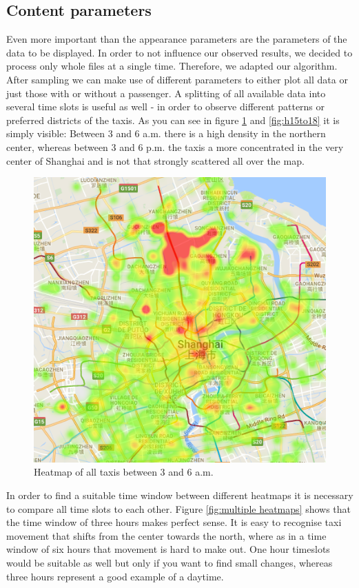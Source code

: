 \documentclass[11pt,conference,a4paper,twocolumns,romanappendices]{IEEEtran}
\begin{document}
\subsection{Content parameters}
Even more important than the appearance parameters are the parameters of the data to be displayed.
In order to not influence our observed results, we decided to process only whole files at a single time. Therefore, we adapted our algorithm.
After sampling we can make use of different parameters to either plot all data or just those with or without a passenger.
A splitting of all available data into several time slots is useful as well - in order to observe different patterns or preferred districts of the taxis.
As you can see in figure \ref{fig:h3to6} and \ref{fig:h15to18} it is simply visible: Between 3 and 6 a.m. there is a high density in the northern center, whereas between 3 and 6 p.m. the taxis a more concentrated in the very center of Shanghai and is not that strongly scattered all over the map.

\begin{figure}[h]
\centering
\includegraphics[scale=0.45]{3to6.png}
\caption{\label{fig:h3to6}Heatmap of all taxis between 3 and 6 a.m.}
\end{figure}

In order to find a suitable time window between different heatmaps it is necessary to compare all time slots to each other. Figure \ref{fig:multiple heatmaps} shows that the time window of three hours makes perfect sense. It is easy to recognise taxi movement that shifts from the center towards the north, where as in a time window of six hours that movement is hard to make out. One hour timeslots would be suitable as well but only if you want to find small changes, whereas three hours represent a good example of a daytime.
\end{document}
